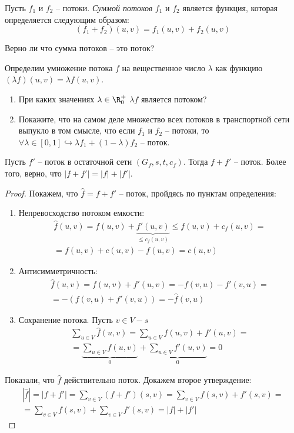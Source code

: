\Def Пусть $f_1$ и $f_2$ -- потоки. \textit{Суммой потоков} $f_1$ и $f_2$ является функция, которая определяется следующим образом:
\begin{equation*}
    (f_1 + f_2) (u, v) = f_1(u, v) + f_2(u, v)
\end{equation*}

\Exe Верно ли что сумма потоков -- это поток?

\Exe Определим умножение потока $f$ на вещественное число $\lambda$ как функцию $(\lambda f)(u, v) = \lambda f(u, v)$.
\begin{enumerate}
    \item При каких значениях $\lambda \in \R^+_0$ $\lambda f$ является потоком?
    \item Покажите, что на самом деле множество всех потоков в транспортной сети выпукло в том смысле, что если $f_1$ и $f_2$ -- потоки, то $\forall \lambda \in [0, 1] \hookrightarrow \lambda f_1 + (1 - \lambda) f_2 \text{ -- поток.}$
\end{enumerate}


\Lm Пусть $f'$ -- поток в остаточной сети $(G_f, s, t, c_f)$. Тогда $f + f'$ -- поток. 
Более того, верно, что $|f + f'| = |f| + |f'|$.
\begin{proof}

    Покажем, что $\hat f = f + f'$ -- поток, пройдясь по пунктам определения:
    \begin{enumerate}
        \item Непревосходство потоком емкости:
            \begin{multline*}
                \hat f(u, v) = f(u, v) + \underbrace{f'(u, v)}_{\leq c_f(u, v)} \leq f(u, v) + c_f(u, v) = \\ = f(u, v) + c(u, v) - f(u, v) = c(u, v)
            \end{multline*}
        \item Антисимметричность:
            \begin{multline*}
                \hat f(u, v) = f(u, v) + f'(u, v) = -f(v, u) - f'(v, u) = \\ = - (f(v, u) + f'(v, u)) = - \hat f(v, u)
            \end{multline*}
        \item Сохранение потока. Пусть $v \in V - s$
            \begin{multline*}
                \sum\limits_{u \in V} \hat f(u, v) = \sum\limits_{u \in V} f(u, v) + f'(u, v) = \\
                = \underbrace{\sum\limits_{u \in V} f(u, v)}_{0} + \underbrace{\sum\limits_{u \in V} f'(u, v)}_{0} = 0
            \end{multline*}
    \end{enumerate}
    
    Показали, что $\hat f$ действительно поток. Докажем второе утверждение:
    \begin{multline*}
        |\hat f| = |f + f'| = \sum\limits_{v \in V} (f + f') (s, v) = \sum\limits_{v \in V} f(s, v) + f'(s, v) = \\
        = \sum\limits_{v \in V} f(s, v) + \sum\limits_{v \in V} f'(s, v) = |f| + |f'|
    \end{multline*}
\end{proof}


